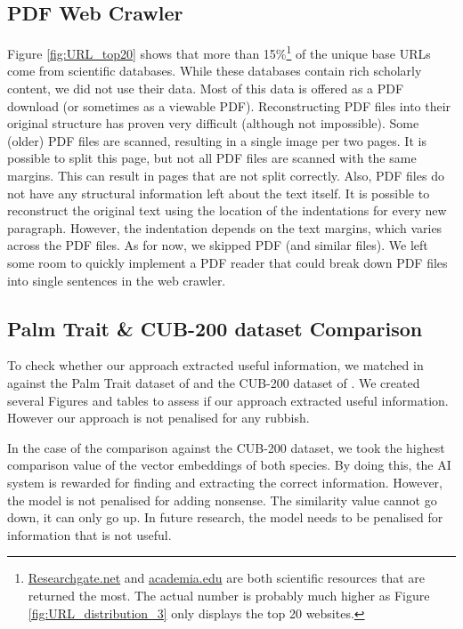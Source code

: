 \documentclass[a4paper, 12pt, oneside]{book} %
\begin{document}

\subsection{PDF Web Crawler}
Figure \ref{fig:URL_top20} shows that more than 15\%\footnote{\href{https://www.researchgate.net/}{Researchgate.net} and \href{https://www.academia.edu/}{academia.edu} are both scientific resources that are returned the most. The actual number is probably much higher as Figure \ref{fig:URL_distribution_3} only displays the top 20 websites.} of the unique base URLs come from scientific databases.
While these databases contain rich scholarly content, we did not use their data.
Most of this data is offered as a PDF download (or sometimes as a viewable PDF).
Reconstructing PDF files into their original structure has proven very difficult (although not impossible).
Some (older) PDF files are scanned, resulting in a single image per two pages. 
It is possible to split this page, but not all PDF files are scanned with the same margins. 
This can result in pages that are not split correctly.
Also, PDF files do not have any structural information left about the text itself. 
It is possible to reconstruct the original text using the location of the indentations for every new paragraph.
However, the indentation depends on the text margins, which varies across the PDF files.
As for now, we skipped PDF (and similar files). 
We left some room to quickly implement a PDF reader that could break down PDF files into single sentences in the web crawler.

\subsection{Palm Trait \& CUB-200 dataset Comparison}
To check whether our approach extracted useful information, we matched in against the Palm Trait dataset of \textcite{kissling_palmtraits_2019} and the CUB-200 dataset of \textcite{welinder_caltech-ucsd_2010}.
We created several Figures and tables to assess if our approach extracted useful information.
However our approach is not penalised for any rubbish.

In the case of the comparison against the CUB-200 dataset, we took the highest comparison value of the vector embeddings of both species.
By doing this, the AI system is rewarded for finding and extracting the correct information.
However, the model is not penalised for adding nonsense.
The similarity value cannot go down, it can only go up.
In future research, the model needs to be penalised for information that is not useful.
\end{document}
